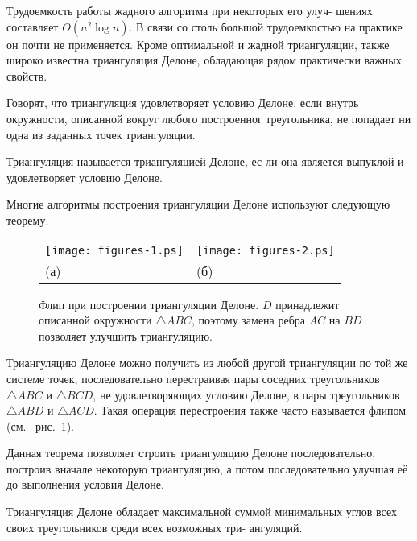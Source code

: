 Трудоемкость работы жадного алгоритма при некоторых его улуч- шениях
составляет $O(n^2 \log n)$. В связи со столь большой трудоемкостью
на практике он почти не применяется. Кроме оптимальной и жадной
триангуляции, также широко известна триангуляция Делоне, обладающая
рядом практически важных свойств.

\begin{define}
  Говорят, что триангуляция удовлетворяет условию Делоне, если внутрь
  окружности, описанной вокруг любого построенног треугольника, не
  попадает ни одна из заданных точек триангуляции.
\end{define}

\begin{define}
  Триангуляция называется триангуляцией Делоне, ес ли она является
  выпуклой и удовлетворяет условию Делоне.
\end{define}

Многие  алгоритмы  построения  триангуляции  Делоне  используют
следующую теорему.

\begin{figure}
  \begin{tabularx}{\textwidth}{YY}
    \texttt{[image: figures-1.ps]} & \texttt{[image: figures-2.ps]} \\
    (а) & (б) \\
  \end{tabularx}
  \caption{Флип при построении триангуляции Делоне. $D$ принадлежит
    описанной окружности $\triangle ABC$, поэтому замена ребра $AC$
    на $BD$ позволяет улучшить триангуляцию.}
  \label{fig:flip}
\end{figure}

\begin{theorem}
  Триангуляцию Делоне можно получить из любой другой триангуляции по
  той же системе точек, последовательно перестраивая пары соседних
  треугольников $\triangle ABC$ и $\triangle BCD$, не удовлетворяющих
  условию Делоне, в пары треугольников $\triangle ABD$ и $\triangle
  ACD$. Такая операция перестроения также часто называется флипом
  (см.~ рис.~\ref{fig:flip}).
\end{theorem}

Данная теорема позволяет строить триангуляцию Делоне последовательно,
построив вначале некоторую триангуляцию, а потом последовательно
улучшая её до выполнения условия Делоне.

\begin{theorem}
Триангуляция  Делоне  обладает  максимальной  суммой
минимальных углов всех своих треугольников среди всех возможных три-
ангуляций.
\end{theorem}

